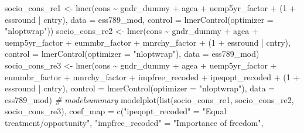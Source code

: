 \documentclass[
]{article}
\newenvironment{Shaded}{\begin{snugshade}}{\end{snugshade}}
\newcommand{\AttributeTok}[1]{\textcolor[rgb]{0.77,0.63,0.00}{#1}}
\newcommand{\CommentTok}[1]{\textcolor[rgb]{0.56,0.35,0.01}{\textit{#1}}}
\newcommand{\DecValTok}[1]{\textcolor[rgb]{0.00,0.00,0.81}{#1}}
\newcommand{\FunctionTok}[1]{\textcolor[rgb]{0.00,0.00,0.00}{#1}}
\newcommand{\NormalTok}[1]{#1}
\newcommand{\OtherTok}[1]{\textcolor[rgb]{0.56,0.35,0.01}{#1}}
\newcommand{\SpecialCharTok}[1]{\textcolor[rgb]{0.00,0.00,0.00}{#1}}
\newcommand{\StringTok}[1]{\textcolor[rgb]{0.31,0.60,0.02}{#1}}
\begin{document}
\begin{Shaded}
\begin{Highlighting}[]
\NormalTok{socio\_cons\_re1 }\OtherTok{\textless{}{-}} \FunctionTok{lmer}\NormalTok{(cons }\SpecialCharTok{\textasciitilde{}}\NormalTok{ gndr\_dummy }\SpecialCharTok{+}\NormalTok{ agea }\SpecialCharTok{+}\NormalTok{ uemp5yr\_factor }\SpecialCharTok{+}\NormalTok{ (}\DecValTok{1} \SpecialCharTok{+}\NormalTok{ essround }\SpecialCharTok{|}\NormalTok{ cntry),}
                       \AttributeTok{data =}\NormalTok{ ess789\_mod,}
                       \AttributeTok{control =} \FunctionTok{lmerControl}\NormalTok{(}\AttributeTok{optimizer =} \StringTok{"nloptwrap"}\NormalTok{))}
\NormalTok{socio\_cons\_re2 }\OtherTok{\textless{}{-}} \FunctionTok{lmer}\NormalTok{(cons }\SpecialCharTok{\textasciitilde{}}\NormalTok{ gndr\_dummy }\SpecialCharTok{+}\NormalTok{ agea }\SpecialCharTok{+}\NormalTok{ uemp5yr\_factor }\SpecialCharTok{+}\NormalTok{ eummbr\_factor }\SpecialCharTok{+}\NormalTok{ mnrchy\_factor }\SpecialCharTok{+}
\NormalTok{                         (}\DecValTok{1} \SpecialCharTok{+}\NormalTok{ essround }\SpecialCharTok{|}\NormalTok{ cntry), }
                       \AttributeTok{control =} \FunctionTok{lmerControl}\NormalTok{(}\AttributeTok{optimizer =} \StringTok{"nloptwrap"}\NormalTok{),}
                       \AttributeTok{data =}\NormalTok{ ess789\_mod)}
\NormalTok{socio\_cons\_re3 }\OtherTok{\textless{}{-}} \FunctionTok{lmer}\NormalTok{(cons }\SpecialCharTok{\textasciitilde{}}\NormalTok{ gndr\_dummy }\SpecialCharTok{+}\NormalTok{ agea }\SpecialCharTok{+}\NormalTok{ uemp5yr\_factor }\SpecialCharTok{+}\NormalTok{ eummbr\_factor }\SpecialCharTok{+}\NormalTok{ mnrchy\_factor }\SpecialCharTok{+} 
\NormalTok{                        impfree\_recoded }\SpecialCharTok{+}\NormalTok{ ipeqopt\_recoded }\SpecialCharTok{+}\NormalTok{ (}\DecValTok{1} \SpecialCharTok{+}\NormalTok{ essround }\SpecialCharTok{|}\NormalTok{ cntry), }
                       \AttributeTok{control =} \FunctionTok{lmerControl}\NormalTok{(}\AttributeTok{optimizer =} \StringTok{"nloptwrap"}\NormalTok{),}
                       \AttributeTok{data =}\NormalTok{ ess789\_mod)}
\CommentTok{\# modelsummary }
\FunctionTok{modelplot}\NormalTok{(}\FunctionTok{list}\NormalTok{(socio\_cons\_re1, socio\_cons\_re2, socio\_cons\_re3),}
          \AttributeTok{coef\_map =} \FunctionTok{c}\NormalTok{(}\StringTok{"ipeqopt\_recoded"} \OtherTok{=} \StringTok{"Equal treatment/opportunity"}\NormalTok{, }
                       \StringTok{"impfree\_recoded"} \OtherTok{=} \StringTok{"Importance of freedom"}\NormalTok{, }

\end{Highlighting}
\end{Shaded}
\end{document}
